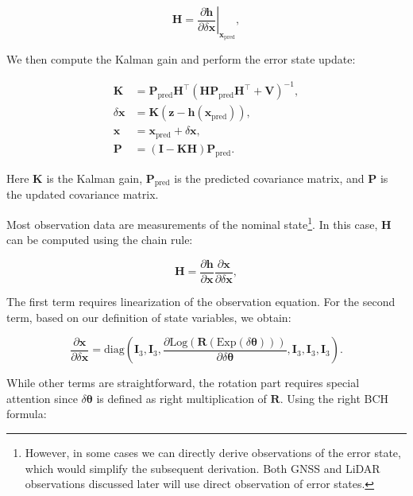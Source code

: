 \begin{equation}\label{eq:H-definition}
	\bm{H} = \left. \frac{\partial \bm{h}}{\partial \delta \bm{x}} \right|_{\bm{x}_{\text{pred}}},
\end{equation}

We then compute the Kalman gain and perform the error state update:

\begin{subequations}\label{eq:eskf-update}
	\begin{align}
		\bm{K} &= \bm{P}_{\mathrm{pred}} \bm{H}^\top(\bm{H} \bm{P}_{\mathrm{pred}} \bm{H}^\top + \bm{V})^{-1}, \\
		\delta \bm{x} &= \bm{K} (\bm{z} - \bm{h}(\bm{x}_{\mathrm{pred}})), \\
		\bm{x} &= \bm{x}_{\text{pred}} + \delta \bm{x}, \\
		\bm{P} &= (\bm{I} - \bm{K} \bm{H}) \bm{P}_{\mathrm{pred}}.
	\end{align}
\end{subequations}

Here $\bm{K}$ is the Kalman gain, $\bm{P}_{\mathrm{pred}}$ is the predicted covariance matrix, and $\bm{P}$ is the updated covariance matrix.

Most observation data are measurements of the nominal state\footnote{However, in some cases we can directly derive observations of the error state, which would simplify the subsequent derivation. Both GNSS and LiDAR observations discussed later will use direct observation of error states.}. In this case, $\bm{H}$ can be computed using the chain rule:

\begin{equation}\label{eq:H-chain-rule}
	\bm{H} = \frac{\partial \bm{h}}{\partial \bm{x}} \frac{\partial \bm{x}}{\partial \delta \bm{x}},
\end{equation}

The first term requires linearization of the observation equation. For the second term, based on our definition of state variables, we obtain:

\begin{equation}\label{eq:state-derivative}
	\frac{\partial \bm{x}}{\partial \delta \bm{x}} = \mathrm{diag}\left(\bm{I}_3, \bm{I}_3, \frac{\partial \mathrm{Log} (\bm{R}(\mathrm{Exp}(\delta \boldsymbol{\theta})))}{\partial \delta \boldsymbol{\theta}}, \bm{I}_3, \bm{I}_3, \bm{I}_3\right).
\end{equation}

While other terms are straightforward, the rotation part requires special attention since $\delta \boldsymbol{\theta}$ is defined as right multiplication of $\bm{R}$. Using the right BCH formula:

